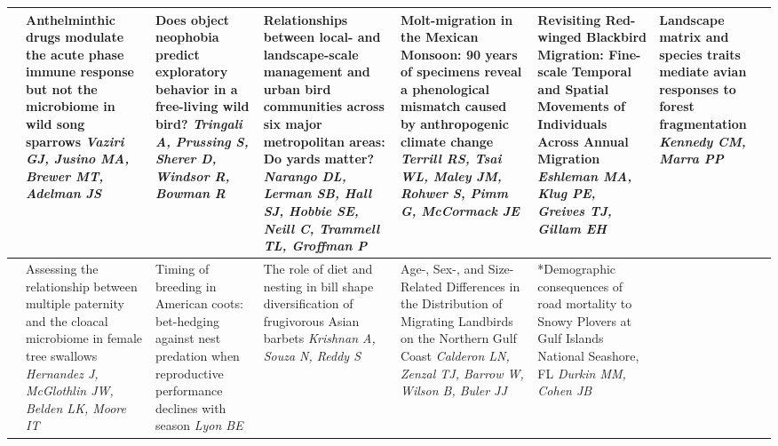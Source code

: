 \begin{tabular}{|x{0.75cm}|a{2.25cm}|x{2.25cm}|x{2.25cm}|x{2.25cm}|x{2.25cm}|x{2.25cm}|}
\hline
{}&Anthelminthic drugs modulate the acute phase immune response but not the microbiome in wild song sparrows \newline \newline \textit{Vaziri GJ, Jusino MA, Brewer MT, Adelman JS} & Does object neophobia predict exploratory behavior in a free-living wild bird? \newline \newline \textit{Tringali A, Prussing S, Sherer D, Windsor R, Bowman R} & Relationships between local- and landscape-scale management and urban bird communities across six major metropolitan areas: Do yards matter? \newline \newline \textit{Narango DL, Lerman SB, Hall SJ, Hobbie SE, Neill C, Trammell TL, Groffman P} & Molt-migration in the Mexican Monsoon: 90 years of specimens reveal a phenological mismatch caused by anthropogenic climate change \newline \newline \textit{Terrill RS, Tsai WL, Maley JM, Rohwer S, Pimm G, McCormack JE} & Revisiting Red-winged Blackbird Migration: Fine-scale Temporal and Spatial Movements of Individuals Across Annual Migration \newline \newline \textit{Eshleman MA, Klug PE, Greives TJ, Gillam EH} & Landscape matrix and species traits mediate avian responses to forest fragmentation \newline \newline \textit{Kennedy CM, Marra PP}\\
\hline
{}&Assessing the relationship between multiple paternity and the cloacal microbiome in female tree swallows \newline \newline \textit{Hernandez J, McGlothlin JW, Belden LK, Moore IT} & Timing of breeding in American coots: bet-hedging against nest predation when reproductive performance declines with season \newline \newline \textit{Lyon BE} & The role of diet and nesting in bill shape diversification of frugivorous Asian barbets \newline \newline \textit{Krishnan A, Souza N, Reddy S} & Age-, Sex-, and Size-Related Differences in the Distribution of Migrating Landbirds on the Northern Gulf Coast \newline \newline \textit{Calderon LN, Zenzal TJ, Barrow W, Wilson B, Buler JJ} & *Demographic consequences of road mortality to Snowy Plovers at Gulf Islands National Seashore, FL \newline \newline \textit{Durkin MM, Cohen JB}\\

\end{tabular}
